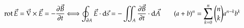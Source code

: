 \[\operatorname{rot}{\vec{E}} = \vec{\nabla} \times \vec{E} =
-\dfrac{\partial\vec{B}}{\partial t}
\Longleftrightarrow
\oint_{\partial A} \vec{E} \cdot \mathrm{d}\vec{s} =
-\iint_{A} \dfrac{\partial\vec{B}}{\partial t} \cdot \mathrm{d}\vec{A}
\qquad
(a + b)^n = \sum_{k = 0}^n {n \choose k} a^{n-k} b^k\]
